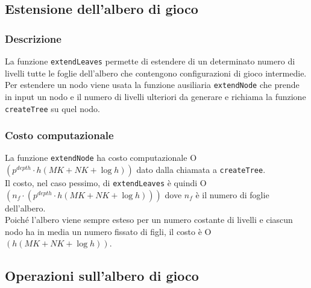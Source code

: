 \documentclass[11pt]{article}
\begin{document}
\subsection*{Estensione dell'albero di gioco}
\subsubsection*{Descrizione}
La funzione \texttt{extendLeaves} permette di estendere di un determinato numero di livelli tutte le foglie dell'albero che contengono configurazioni di gioco intermedie.\\
Per estendere un nodo viene usata la funzione ausiliaria \texttt{extendNode} che prende in input un nodo e il numero di livelli ulteriori da generare e richiama la funzione \texttt{createTree} su quel nodo.
\subsubsection*{Costo computazionale}
La funzione \texttt{extendNode} ha costo computazionale O$(p^{depth} \cdot h(MK + NK + \log h))$ dato dalla chiamata a \texttt{createTree}.\\
Il costo, nel caso pessimo, di \texttt{extendLeaves} è quindi O$(n_f\cdot(p^{depth} \cdot h(MK + NK + \log h)))$ dove $n_f$ è il numero di foglie dell'albero.\\
Poiché l'albero viene sempre esteso per un numero costante di livelli e ciascun nodo ha in media un numero fissato di figli, il costo è O$(h(MK+NK+\log h))$.

\newpage

\subsection*{Operazioni sull'albero di gioco}
\end{document}
